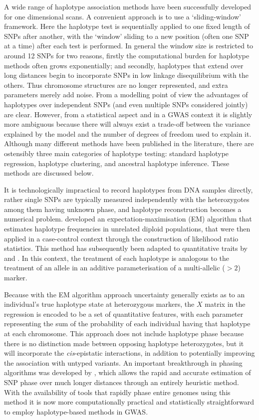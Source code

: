 A wide range of haplotype association methods have been successfully developed for one dimensional scans. A convenient approach is to use a `sliding-window' framework. Here the haplotype test is sequentially applied to one fixed length of SNPs after another, with the `window' sliding to a new position (often one SNP at a time) after each test is performed. In general the window size is restricted to around 12 SNPs for two reasons, firstly the computational burden for haplotype methods often grows exponentially; and secondly, haplotypes that extend over long distances begin to incorporate SNPs in low linkage disequilibrium with the others. Thus chromosome structures are no longer represented, and extra parameters merely add noise. From a modelling point of view the advantages of haplotypes over independent SNPs (and even multiple SNPs considered jointly) are clear. However, from a statistical aspect and in a GWAS context it is slightly more ambiguous because there will always exist a trade-off between the variance explained by the model and the number of degrees of freedom used to explain it. Although many different methods have been published in the literature, there are ostensibly three main categories of haplotype testing: standard haplotype regression, haplotype clustering, and ancestral haplotype inference. These methods are discussed below.

It is technologically impractical to record haplotypes from DNA samples directly, rather single SNPs are typically measured independently with the heterozygotes among them having unknown phase, and haplotype reconstruction becomes a numerical problem. \cite{Excoffier1995} developed an expectation-maximisation (EM) algorithm that estimates haplotype frequencies in unrelated diploid populations, that were then applied in a case-control context through the construction of likelihood ratio statistics. This method has subsequently been adapted to quantitative traits by \citet{Powell2011} and \citet{Floyd2011}. In this context, the treatment of each haplotype is analogous to the treatment of an allele in an additive parameterisation of a multi-allelic ($>2$) marker. 

Because with the EM algorithm approach uncertainty generally exists as to an individual's true haplotype state at heterozygous markers, the $X$ matrix in the regression is encoded to be a set of quantitative features, with each parameter representing the sum of the probability of each individual having that haplotype at each chromosome. This approach does not include haplotype phase because there is no distinction made between opposing haplotype heterozygotes, but it will incorporate the \emph{cis}-epistatic interactions, in addition to potentially improving the association with untyped variants. An important breakthrough in phasing algorithms was developed by \citet{Kong2008}, which allows the rapid and accurate estimation of SNP phase over much longer distances through an entirely heuristic method. With the availability of tools that rapidly phase entire genomes using this method \citep{Hickey2011} it is now more computationally practical and statistically straightforward to employ haplotype-based methods in GWAS.

